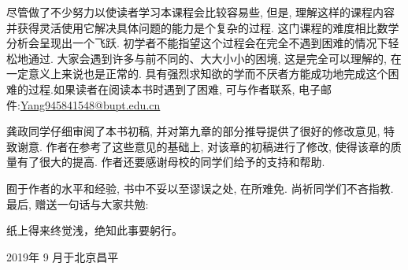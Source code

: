 \documentclass[10pt,UTF8]{ctexbook}
\newcommand{\kai}{\kaishu}
\newcommand{\BWKai}{\kai}
\theoremstyle{plain}
\numberwithin{equation}{chapter}
\numberwithin{algorithm}{chapter}
\begin{document}
尽管做了不少努力以使读者学习本课程会比较容易些, 但是, 理解这样的课程内容并获得灵活使用它解决具体问题的能力是个复杂的过程. 这门课程的难度相比数学分析会呈现出一个飞跃. 初学者不能指望这个过程会在完全不遇到困难的情况下轻松地通过. 大家会遇到许多与前不同的、大大小小的困境, 这是完全可以理解的, 在一定意义上来说也是正常的. 具有强烈求知欲的学而不厌者方能成功地完成这个困难的过程.如果读者在阅读本书时遇到了困难, 可与作者联系, 电子邮件:\url{Yang945841548@bupt.edu.cn}

龚政同学仔细审阅了本书初稿, 并对第九章的部分推导提供了很好的修改意见, 特致谢意. 作者在参考了这些意见的基础上, 对该章的初稿进行了修改, 使得该章的质量有了很大的提高. 作者还要感谢母校的同学们给予的支持和帮助.

囿于作者的水平和经验, 书中不妥以至谬误之处, 在所难免. 尚祈同学们不吝指教. 最后, 赠送一句话与大家共勉:
\begin{center}
	{\BWKai\color{blue}
		纸上得来终觉浅，绝知此事要躬行。\bigskip
	}
\end{center}
\begin{flushright}
	{}
	
	2019年 9 月于北京昌平
\end{flushright}



\clearpage{\pagestyle{empty}\cleardoublepage}
\tableofcontents


\mainmatter















\clearpage{\pagestyle{empty}\cleardoublepage}
\backmatter
{}
\end{document}

